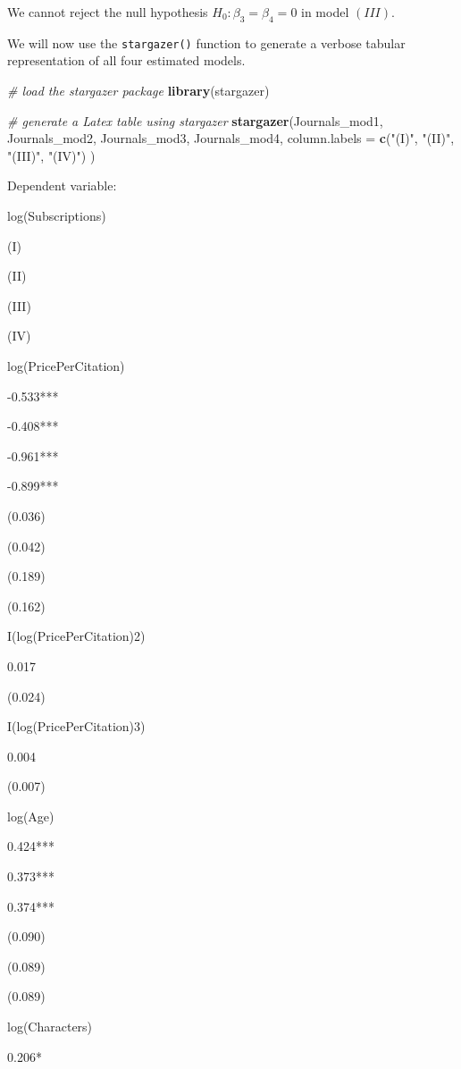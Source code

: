 \documentclass[]{book}
\newenvironment{Shaded}{\begin{snugshade}}{\end{snugshade}}
\newcommand{\KeywordTok}[1]{\textcolor[rgb]{0.13,0.29,0.53}{\textbf{#1}}}
\newcommand{\DataTypeTok}[1]{\textcolor[rgb]{0.13,0.29,0.53}{#1}}
\newcommand{\StringTok}[1]{\textcolor[rgb]{0.31,0.60,0.02}{#1}}
\newcommand{\CommentTok}[1]{\textcolor[rgb]{0.56,0.35,0.01}{\textit{#1}}}
\newcommand{\NormalTok}[1]{#1}
\theoremstyle{definition}
\theoremstyle{definition}
\theoremstyle{definition}
\theoremstyle{remark}
\begin{document}
We cannot reject the null hypothesis \(H_0: \beta_3=\beta_4=0\) in model
\((III)\).

We will now use the \texttt{stargazer()} function to generate a verbose
tabular representation of all four estimated models.

\begin{Shaded}
\begin{Highlighting}[]
\CommentTok{# load the stargazer package}
\KeywordTok{library}\NormalTok{(stargazer)}

\CommentTok{# generate a Latex table using stargazer}
\KeywordTok{stargazer}\NormalTok{(Journals_mod1, Journals_mod2, Journals_mod3, Journals_mod4,}
          \DataTypeTok{column.labels =} \KeywordTok{c}\NormalTok{(}\StringTok{"(I)"}\NormalTok{, }\StringTok{"(II)"}\NormalTok{, }\StringTok{"(III)"}\NormalTok{, }\StringTok{"(IV)"}\NormalTok{)}
\NormalTok{          )}
\end{Highlighting}
\end{Shaded}

Dependent variable:

log(Subscriptions)

(I)

(II)

(III)

(IV)

log(PricePerCitation)

-0.533***

-0.408***

-0.961***

-0.899***

(0.036)

(0.042)

(0.189)

(0.162)

I(log(PricePerCitation)2)

0.017

(0.024)

I(log(PricePerCitation)3)

0.004

(0.007)

log(Age)

0.424***

0.373***

0.374***

(0.090)

(0.089)

(0.089)

log(Characters)

0.206*
\end{document}
